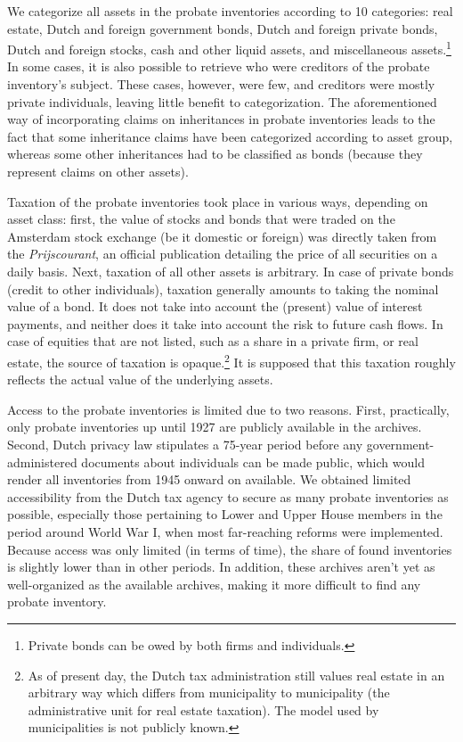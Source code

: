 We categorize all assets in the probate inventories according to 10 categories: real estate, Dutch and foreign government bonds, Dutch and foreign private bonds, Dutch and foreign stocks, cash and other liquid assets, and miscellaneous assets.\footnote{Private bonds can be owed by  both firms and individuals.} In some cases, it is also possible to retrieve who were creditors of the probate inventory's subject. These cases, however, were few, and creditors were mostly private individuals, leaving little benefit to categorization. The aforementioned way of incorporating claims on inheritances in probate inventories leads to the fact that some inheritance claims have been categorized according to asset group, whereas some other inheritances had to be classified as bonds (because they represent claims on other assets). 

Taxation of the probate inventories took place in various ways, depending on asset class: first, the value of stocks and bonds that were traded on the Amsterdam stock exchange (be it domestic or foreign) was directly taken from the \textit{Prijscourant}, an official publication detailing the price of all securities on a daily basis. Next, taxation of all other assets is arbitrary. In case of private bonds (credit to other individuals), taxation generally amounts to taking the nominal value of a bond. It does not take into account the (present) value of interest payments, and neither does it take into account the risk to future cash flows. In case of equities that are not listed, such as a share in a private firm, or real estate, the source of taxation is opaque.\footnote{As of present day, the Dutch tax administration still values real estate in an arbitrary way which differs from municipality to municipality (the administrative unit for real estate taxation). The model used by municipalities is not publicly known.} It is supposed that this taxation roughly reflects the actual value of the underlying assets. 

Access to the probate inventories is limited due to two reasons. First, practically, only probate inventories up until 1927 are publicly available in the archives. Second, Dutch privacy law stipulates a 75-year period before any government-administered documents about individuals can be made public, which would render all inventories from 1945 onward on available. We obtained limited accessibility from the Dutch tax agency to secure as many probate inventories as possible, especially those pertaining to Lower and Upper House members in the period around World War I, when most far-reaching reforms were implemented. Because access was only limited (in terms of time), the share of found inventories is slightly lower than in other periods. In addition, these archives aren't yet as well-organized as the available archives, making it more difficult to find any probate inventory. 

